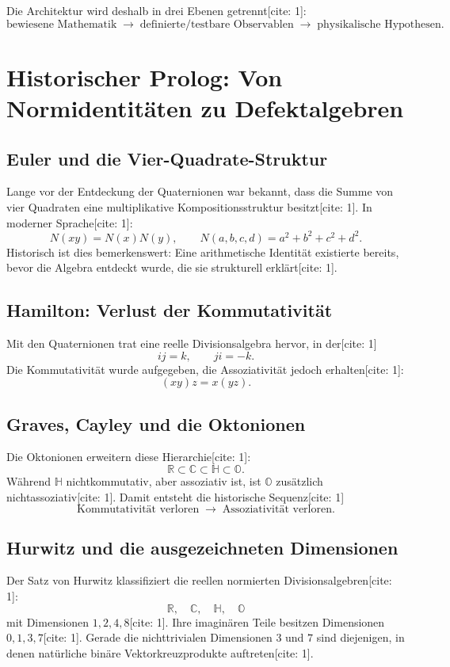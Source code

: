 \documentclass[11pt,a4paper]{article}
\newcommand{\OO}{\mathbb{O}}
\newcommand{\HH}{\mathbb{H}}
\newcommand{\RR}{\mathbb{R}}
\begin{document}
	Die Architektur wird deshalb in drei Ebenen getrennt[cite: 1]:
	\[
	\boxed{\text{bewiesene Mathematik}\;\longrightarrow\;\text{definierte/testbare Observablen}\;\longrightarrow\;\text{physikalische Hypothesen}.}
	\]
	
	\section{Historischer Prolog: Von Normidentitäten zu Defektalgebren}
	\subsection{Euler und die Vier-Quadrate-Struktur}
	Lange vor der Entdeckung der Quaternionen war bekannt, dass die Summe von vier Quadraten eine multiplikative Kompositionsstruktur besitzt[cite: 1]. In moderner Sprache[cite: 1]:
	\[
	N(xy)=N(x)N(y),\qquad N(a,b,c,d)=a^2+b^2+c^2+d^2.
	\]
	Historisch ist dies bemerkenswert: Eine arithmetische Identität existierte bereits, bevor die Algebra entdeckt wurde, die sie strukturell erklärt[cite: 1].
	
	\subsection{Hamilton: Verlust der Kommutativität}
	Mit den Quaternionen trat eine reelle Divisionsalgebra hervor, in der[cite: 1]
	\[
	ij=k,\qquad ji=-k.
	\]
	Die Kommutativität wurde aufgegeben, die Assoziativität jedoch erhalten[cite: 1]:
	\[
	(xy)z=x(yz).
	\]
	
	\subsection{Graves, Cayley und die Oktonionen}
	Die Oktonionen erweitern diese Hierarchie[cite: 1]:
	\[
	\RR\subset\mathbb C\subset\HH\subset\OO.
	\]
	Während $\HH$ nichtkommutativ, aber assoziativ ist, ist $\OO$ zusätzlich nichtassoziativ[cite: 1]. Damit entsteht die historische Sequenz[cite: 1]
	\[
	\boxed{\text{Kommutativität verloren}\;\longrightarrow\;\text{Assoziativität verloren}.}
	\]
	
	\subsection{Hurwitz und die ausgezeichneten Dimensionen}
	Der Satz von Hurwitz klassifiziert die reellen normierten Divisionsalgebren[cite: 1]:
	\[
	\RR,\quad\mathbb C,\quad\HH,\quad\OO
	\]
	mit Dimensionen $1,2,4,8$[cite: 1]. Ihre imaginären Teile besitzen Dimensionen $0,1,3,7$[cite: 1]. Gerade die nichttrivialen Dimensionen $3$ und $7$ sind diejenigen, in denen natürliche binäre Vektorkreuzprodukte auftreten[cite: 1].
	
\end{document}
